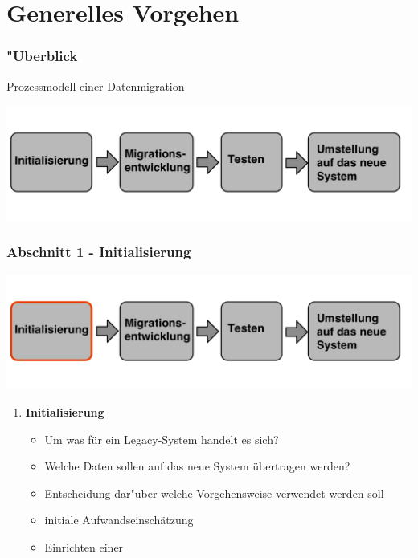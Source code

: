 \documentclass{beamer}
\begin{document}
	\section{Generelles Vorgehen}
	
	\begin{frame}
		\frametitle{"Uberblick}
		
		Prozessmodell einer Datenmigration
		
		\centering
		\includegraphics[width=\textwidth]{../images/prozessmodellt.png}
		
%			
%			
%			
%			
	\end{frame}
	
	\begin{frame}
		\frametitle{Abschnitt 1 - Initialisierung}
		
		\centering
		\includegraphics[width=\textwidth]{../images/prozessmodell1t.png}\\
	
		
		\begin{enumerate}
			\item \textbf{Initialisierung}
			\begin{itemize}
				\item Um was für ein Legacy-System handelt es sich?
				\item Welche Daten sollen auf das neue System übertragen werden?
				\newline
				\item Entscheidung dar"uber welche Vorgehensweise verwendet werden soll
				\item initiale Aufwandseinschätzung
				\item Einrichten einer 
			\end{itemize}
		\end{enumerate}
	\end{frame}
	
\end{document}
